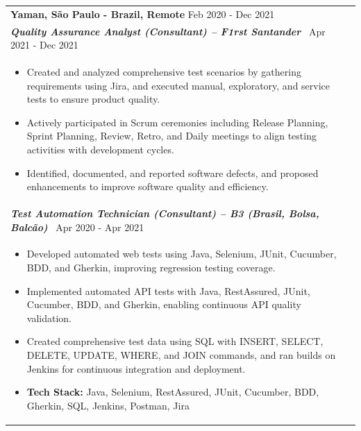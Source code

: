 \documentclass[a4paper,8pt]{article}
\begin{document}
\begin{tabularx}{\linewidth}{ @{}l r@{} }
\textbf{{Yaman, São Paulo - Brazil, Remote}} \hfill \color[HTML]{371e77} Feb 2020 - Dec 2021 \\[4pt]
\color[HTML]{371e77}\textbf{\textit{Quality Assurance Analyst (Consultant) -- F1rst Santander}}\ \hfill \color[HTML]{4B28A4} Apr 2021 - Dec 2021 \\[5pt]
\begin{minipage}[t]{\linewidth}
    \begin{itemize}[nosep,after=\strut, leftmargin=2em, itemsep=2pt]
        \item Created and analyzed comprehensive test scenarios by gathering requirements using Jira, and executed manual, exploratory, and service tests to ensure product quality.
        \item Actively participated in Scrum ceremonies including Release Planning, Sprint Planning, Review, Retro, and Daily meetings to align testing activities with development cycles.
        \item Identified, documented, and reported software defects, and proposed enhancements to improve software quality and efficiency.
    \end{itemize}
\end{minipage}\\[6pt]
\color[HTML]{371e77}\textbf{\textit{Test Automation Technician (Consultant) -- B3 (Brasil, Bolsa, Balcão)}}\ \hfill \color[HTML]{4B28A4} Apr 2020 - Apr 2021 \\[5pt]
\begin{minipage}[t]{\linewidth}
    \begin{itemize}[nosep,after=\strut, leftmargin=2em, itemsep=2pt]
        \item Developed automated web tests using Java, Selenium, JUnit, Cucumber, BDD, and Gherkin, improving regression testing coverage.
        \item Implemented automated API tests with Java, RestAssured, JUnit, Cucumber, BDD, and Gherkin, enabling continuous API quality validation.
        \item Created comprehensive test data using SQL with INSERT, SELECT, DELETE, UPDATE, WHERE, and JOIN commands, and ran builds on Jenkins for continuous integration and deployment.
        \item \textbf{Tech Stack:} Java, Selenium, RestAssured, JUnit, Cucumber, BDD, Gherkin, SQL, Jenkins, Postman, Jira
    \end{itemize}
\end{minipage}\\[6pt]

\end{tabularx}
\end{document}
